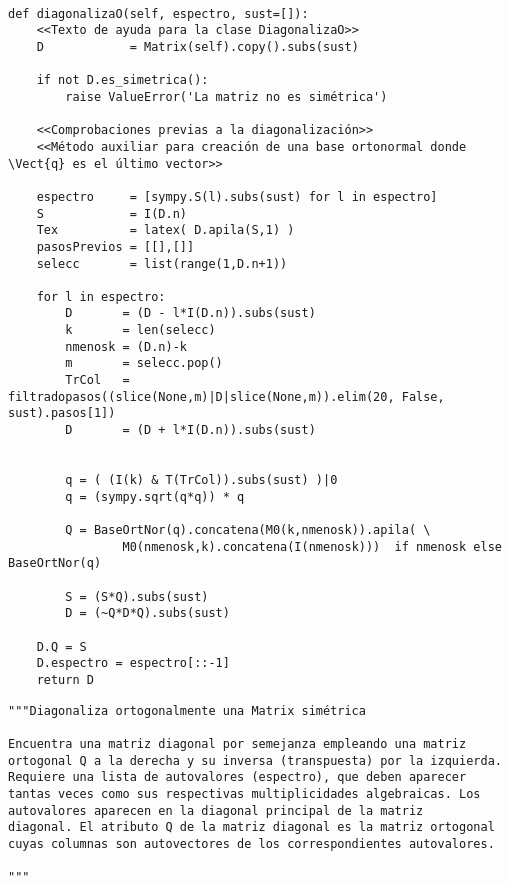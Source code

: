 \documentclass[11pt]{report}
\begin{document}
\begin{verbatim}

def diagonalizaO(self, espectro, sust=[]):
    <<Texto de ayuda para la clase DiagonalizaO>>
    D            = Matrix(self).copy().subs(sust)
    
    if not D.es_simetrica():
        raise ValueError('La matriz no es simétrica')
    
    <<Comprobaciones previas a la diagonalización>>
    <<Método auxiliar para creación de una base ortonormal donde \Vect{q} es el último vector>>
    
    espectro     = [sympy.S(l).subs(sust) for l in espectro]    
    S            = I(D.n)
    Tex          = latex( D.apila(S,1) )
    pasosPrevios = [[],[]]
    selecc       = list(range(1,D.n+1))

    for l in espectro:
        D       = (D - l*I(D.n)).subs(sust)
        k       = len(selecc)
        nmenosk = (D.n)-k
        m       = selecc.pop()
        TrCol   = filtradopasos((slice(None,m)|D|slice(None,m)).elim(20, False, sust).pasos[1])
        D       = (D + l*I(D.n)).subs(sust)
        
        
        q = ( (I(k) & T(TrCol)).subs(sust) )|0
        q = (sympy.sqrt(q*q)) * q
        
        Q = BaseOrtNor(q).concatena(M0(k,nmenosk)).apila( \
                M0(nmenosk,k).concatena(I(nmenosk)))  if nmenosk else BaseOrtNor(q)
            
        S = (S*Q).subs(sust)
        D = (~Q*D*Q).subs(sust)

    D.Q = S
    D.espectro = espectro[::-1]
    return D

\end{verbatim}


\begin{verbatim}
"""Diagonaliza ortogonalmente una Matrix simétrica

Encuentra una matriz diagonal por semejanza empleando una matriz
ortogonal Q a la derecha y su inversa (transpuesta) por la izquierda.
Requiere una lista de autovalores (espectro), que deben aparecer
tantas veces como sus respectivas multiplicidades algebraicas. Los
autovalores aparecen en la diagonal principal de la matriz
diagonal. El atributo Q de la matriz diagonal es la matriz ortogonal
cuyas columnas son autovectores de los correspondientes autovalores.

"""
\end{verbatim}
\end{document}
